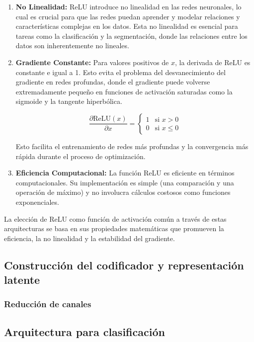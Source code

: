 \begin{enumerate}
	\item \textbf{No Linealidad:}
	ReLU introduce no linealidad en las redes neuronales, lo cual es crucial para que las redes puedan aprender y modelar relaciones y características complejas en los datos. Esta no linealidad es esencial para tareas como la clasificación y la segmentación, donde las relaciones entre los datos son inherentemente no lineales.
	
	\item \textbf{Gradiente Constante:}
	Para valores positivos de $ x $, la derivada de ReLU es constante e igual a 1. Esto evita el problema del desvanecimiento del gradiente en redes profundas, donde el gradiente puede volverse extremadamente pequeño en funciones de activación saturadas como la sigmoide y la tangente hiperbólica.
	
	\[ \frac{\partial \text{ReLU}(x)}{\partial x} = \begin{cases} 
		1 & \text{si } x > 0 \\
		0 & \text{si } x \leq 0 
	\end{cases} \]
	
	Esto facilita el entrenamiento de redes más profundas y la convergencia más rápida durante el proceso de optimización.
	
	\item \textbf{Eficiencia Computacional:}
	La función ReLU es eficiente en términos computacionales. Su implementación es simple (una comparación y una operación de máximo) y no involucra cálculos costosos como funciones exponenciales.
	
\end{enumerate}

La elección de ReLU como función de activación común a través de estas arquitecturas se basa en sus propiedades matemáticas que promueven la eficiencia, la no linealidad y la estabilidad del gradiente.


\subsection{Construcción del codificador y representación latente}

\subsubsection{Reducción de canales}

\subsection{Arquitectura para clasificación}

